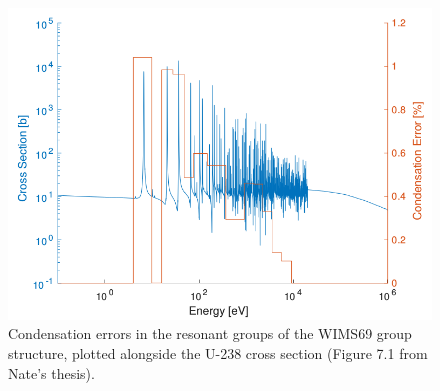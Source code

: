 \begin{figure}[h!]
  \centering
  \includegraphics[width=\linewidth]{figures/case1-error}
  \caption{Condensation errors in the resonant groups of the WIMS69 group structure, plotted alongside the U-238 cross section {(\color{red}Figure 7.1 from Nate's thesis)}.}
  \label{fig:case1-errror}
\end{figure}

